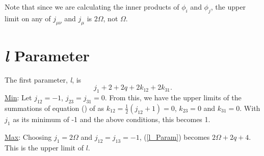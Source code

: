 \documentclass[main.tex]{subfiles}
\begin{document}
Note that since we are calculating the inner products of $\phi_i$ and $\phi_j$, the upper limit on any of $j_{\mu \nu}$ and $j_{\mu}$ is $2\Omega$, not $\Omega$.

\section{\emph{l} Parameter}
The first parameter, \emph{l}, is
\begin{equation}
	\label{l_Param}j_1 + 2 + 2q + 2 k_{12} + 2 k_{31}.
\end{equation}
\underline{Min}: Let $j_{12} = -1$, $j_{23} = j_{31} = 0$.  From this, we have the upper limits of the summations of equation () of \cite{Drake1995} as $k_{12} = \tfrac{1}{2} (j_{12} + 1) = 0$, $k_{23} = 0$ and $k_{31} = 0$.  With $j_1$ as its minimum of -1 and the above conditions, this becomes 1.

\noindent\underline{Max}: Choosing $j_1 = 2 \Omega$ and $j_{12} = j_{13} = -1$, (\ref{l_Param}) becomes $2 \Omega + 2q + 4$.  This is the upper limit of $l$.
\end{document}
